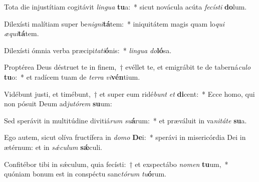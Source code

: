 \item Tota die injustítiam cogitávit \textit{lin}\textit{gua} \textbf{tu}a:~* sicut novácula acúta \textit{fe}\textit{cís}\textit{ti} \textbf{do}lum.
\item Dilexísti malítiam super be\textit{ni}\textit{gni}\textbf{tá}tem:~* iniquitátem magis quam lo\textit{qui} \textit{æ}\textit{qui}\textbf{tá}tem.
\item Dilexísti ómnia verba præcipi\textit{ta}\textit{ti}\textbf{ó}nis:~* \textit{lin}\textit{gua} \textit{do}\textbf{ló}sa.
\item Proptérea Deus déstruet te in finem,~† evéllet te, et emigrábit te de taberná\textit{cu}\textit{lo} \textbf{tu}o:~* et radícem tuam de \textit{ter}\textit{ra} \textit{vi}\textbf{vén}tium.
\item Vidébunt justi, et timébunt,~† et super eum ridé\textit{bunt} \textit{et} \textbf{di}cent:~* Ecce homo, qui non pósuit Deum ad\textit{ju}\textit{tó}\textit{rem} \textbf{su}um:
\item Sed sperávit in multitúdine divitiá\textit{rum} \textit{su}\textbf{á}rum:~* et præváluit in va\textit{ni}\textit{tá}\textit{te} \textbf{su}a.
\item Ego autem, sicut olíva fructífera in \textit{do}\textit{mo} \textbf{De}i:~* sperávi in misericórdia Dei in ætérnum: et in \textit{sǽ}\textit{cu}\textit{lum} \textbf{sǽ}culi.
\item Confitébor tibi in sǽculum, quia fecísti:~† et exspectábo \textit{no}\textit{men} \textbf{tu}um,~* quóniam bonum est in conspéctu sanc\textit{tó}\textit{rum} \textit{tu}\textbf{ó}rum.
